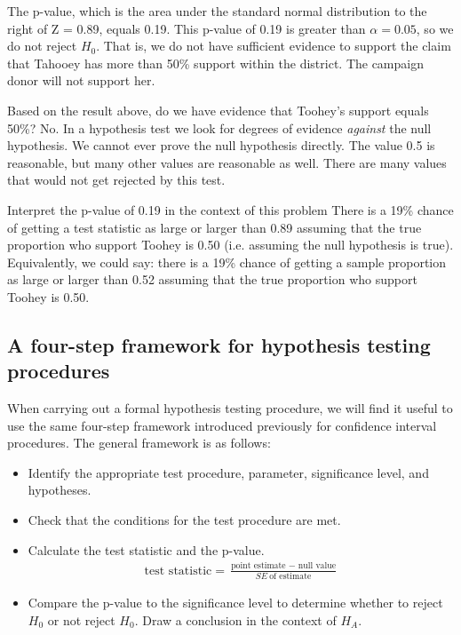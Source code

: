 \D{\newpage}

The p-value, which is the area under the standard normal distribution to the right of Z = 0.89, equals 0.19.  This p-value of 0.19 is greater than $\alpha = 0.05$, so we do not reject $H_0$. That is, we do not have sufficient evidence to support the claim that Tahooey has more than 50\% support within the district.  The campaign donor will not support her.

\begin{examplewrap}
\begin{nexample}{Based on the result above, do we have evidence that Toohey's support equals 50\%?}
No.  In a hypothesis test we look for degrees of evidence \emph{against} the null hypothesis.  We cannot ever prove the null hypothesis directly.  The value 0.5 is reasonable, but many other values are reasonable as well.  There are many values that would not get rejected by this test.
\end{nexample}
\end{examplewrap}

\begin{examplewrap}
\begin{nexample}{Interpret the p-value of 0.19 in the context of this problem}
There is a 19\% chance of getting a test statistic as large or larger than 0.89 assuming that the true proportion who support Toohey is 0.50 (i.e. assuming the null hypothesis is true).  Equivalently, we could say:  there is a 19\% chance of getting a sample proportion as large or larger than 0.52 assuming that the true proportion who support Toohey is 0.50. 
\end{nexample}
\end{examplewrap}

\newpage
\subsection{A four-step framework for hypothesis testing procedures}
When carrying out a formal hypothesis testing procedure, we will find it useful to use the same four-step framework introduced previously for confidence interval procedures.  The general framework is as follows:

\begin{itemize}
\setlength{\itemsep}{0mm}
\item {}  Identify the appropriate test procedure, parameter, significance level, and \mbox{hypotheses.}
\item  {}  Check that the conditions for the test procedure are met. 
\item {} Calculate the test statistic and the p-value.  
\begin{align*}
\text{test statistic} = \frac{\text{point estimate } - \text{ null value}}{SE\ \text{of estimate}}
\end{align*}
\item {} Compare the p-value to the significance level to determine whether to reject $H_0$ or not reject $H_0$.  Draw a conclusion in the context of $H_A$.  
\end{itemize}

